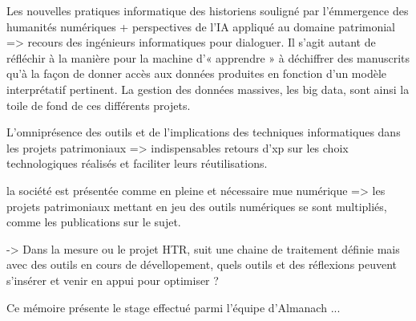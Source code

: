 Les nouvelles pratiques informatique  des historiens souligné par l'émmergence des humanités numériques + perspectives de l'IA appliqué au domaine patrimonial => recours des ingénieurs informatiques pour dialoguer. 
Il s’agit autant de réfléchir à la manière pour la machine d’« apprendre » à déchiffrer des manuscrits qu’à la façon de donner accès aux données produites en fonction d’un modèle interprétatif pertinent. La gestion des données massives, les big data, sont ainsi la toile de fond de ces différents projets.




% 

L'omniprésence des outils et de l'implications des techniques informatiques dans les projets patrimoniaux => indispensables retours d'xp sur les choix technologiques réalisés et faciliter leurs réutilisations.

la société est présentée comme en pleine et nécessaire mue numérique => les projets patrimoniaux mettant en jeu des outils numériques se sont multipliés, comme les publications sur le sujet.




-> Dans la mesure ou le projet HTR, suit une chaine de traitement définie mais avec des outils en cours de dévellopement, quels outils et des réflexions peuvent s'insérer et venir en appui pour optimiser ? 


Ce mémoire présente le stage effectué parmi l'équipe d'Almanach ... 
